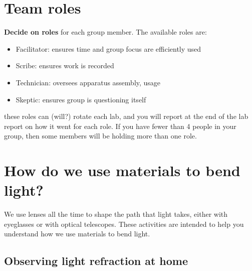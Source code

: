 %	
%	
%	
%
%

\section{Team roles}

\textbf{Decide on roles} for each group member. The available roles are:

\begin{itemize}
	\item Facilitator: ensures time and group focus are efficiently used
	\item Scribe: ensures work is recorded
	\item Technician: oversees apparatus assembly, usage
	\item Skeptic: ensures group is questioning itself
\end{itemize}

these roles can (will?) rotate each lab, and you will report at the end of the lab report on how it went for each role. If you have fewer than 4 people in your group, then some members will be holding more than one role.

\section{How do we use materials to bend light?}

We use lenses all the time to shape the path that light takes, either with eyeglasses or with optical telescopes. These activities are intended to help you understand how we use materials to bend light.

\subsection{Observing light refraction at home}


